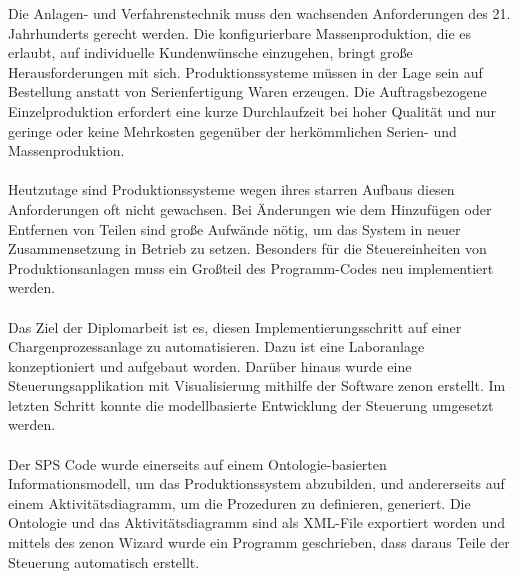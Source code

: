 Die Anlagen- und Verfahrenstechnik muss den wachsenden Anforderungen des 21. Jahrhunderts gerecht werden. Die konfigurierbare Massenproduktion, die es erlaubt, auf individuelle Kundenwünsche einzugehen, bringt große Herausforderungen mit sich. Produktionssysteme müssen in der Lage sein auf Bestellung anstatt von Serienfertigung Waren erzeugen. Die Auftragsbezogene Einzelproduktion erfordert eine kurze Durchlaufzeit bei hoher Qualität und nur geringe oder keine Mehrkosten gegenüber der herkömmlichen Serien- und Massenproduktion. \\\\
Heutzutage sind Produktionssysteme wegen ihres starren Aufbaus diesen Anforderungen oft nicht gewachsen. Bei Änderungen wie dem Hinzufügen oder Entfernen von Teilen sind große Aufwände nötig, um das System in neuer Zusammensetzung in Betrieb zu setzen. Besonders für die Steuereinheiten von Produktionsanlagen muss ein Großteil des Programm-Codes neu implementiert werden.\\\\
Das Ziel der Diplomarbeit ist es, diesen Implementierungsschritt auf einer Chargenprozessanlage zu automatisieren. Dazu ist eine Laboranlage konzeptioniert und aufgebaut worden. Darüber hinaus wurde eine Steuerungsapplikation mit Visualisierung mithilfe der Software zenon erstellt. Im letzten Schritt konnte die modellbasierte Entwicklung der Steuerung umgesetzt werden. 
\\\\
Der \ac{SPS} Code wurde einerseits auf einem Ontologie-basierten Informationsmodell, um das Produktionssystem abzubilden, und andererseits auf einem Aktivitätsdiagramm, um die Prozeduren zu definieren, generiert. Die Ontologie und das Aktivitätsdiagramm sind als \ac{XML}-File exportiert worden und mittels des zenon Wizard wurde ein Programm geschrieben, dass daraus Teile der Steuerung automatisch erstellt.\\\\


